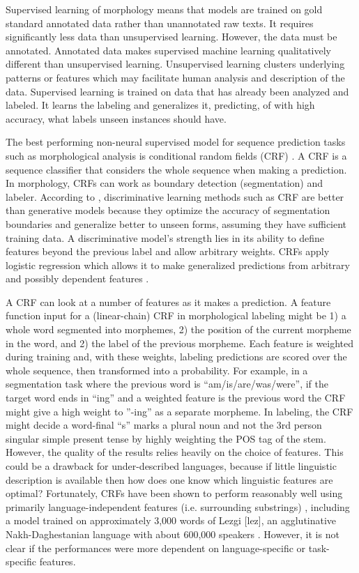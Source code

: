 \documentclass[12pt]{article}
\begin{document}
Supervised learning of morphology means that models are trained on gold standard annotated data rather than unannotated raw texts. It requires significantly less data than unsupervised learning. However, the data must be annotated. Annotated data makes supervised machine learning qualitatively different than unsupervised learning. Unsupervised learning clusters underlying patterns or features which may facilitate human analysis and description of the data. Supervised learning is trained on data that has already been analyzed and labeled. It learns the labeling and generalizes it, predicting, of with high accuracy, what labels unseen instances should have. 

The best performing non-neural supervised model for sequence prediction tasks such as morphological analysis is conditional random fields (CRF) \cite{lafferty_conditional_2001,muller_efficient_2013,ruokolainen_comparative_2016}. A CRF is a sequence classifier that considers the whole sequence when making a prediction. In morphology, CRFs can work as boundary detection (segmentation) and labeler. According to , discriminative learning methods such as CRF are better than generative models because they optimize the accuracy of segmentation boundaries and generalize better to unseen forms, assuming they have sufficient training data. A discriminative model's strength lies in its ability to define features beyond the previous label and allow arbitrary weights. CRFs apply logistic regression which allows it to make generalized predictions from arbitrary and possibly dependent features \cite{ruokolainen_supervised_2013}. 

A CRF can look at a number of features as it makes a prediction. A feature function input for a (linear-chain) CRF in morphological labeling might be 1) a whole word segmented into morphemes, 2) the position of the current morpheme in the word, and 2) the label of the previous morpheme. Each feature is weighted during training and, with these weights, labeling predictions are scored over the whole sequence, then transformed into a probability. For example, in a segmentation task where the previous word is ``am/is/are/was/were'', if the target word ends in ``ing'' and a weighted feature is the previous word the CRF might give a high weight to ''-ing'' as a separate morpheme. In labeling, the CRF might decide a word-final ``s'' marks a plural noun and not the 3rd person singular simple present tense by highly weighting the POS tag of the stem. However, the quality of the results relies heavily on the choice of features. This could be a drawback for under-described languages, because if little linguistic description is available then how does one know which linguistic features are optimal? Fortunately, CRFs have been shown to perform reasonably well using primarily language-independent features (i.e. surrounding substrings) \cite{ruokolainen_comparative_2016,moeller_automatic_2018}, including a model trained on approximately 3,000 words of Lezgi [lez], an agglutinative Nakh-Daghestanian language with about 600,000 speakers \cite{simons_ethnologue:_2018}. However, it is not  clear if the performances were more dependent on language-specific or task-specific features.
\end{document}
